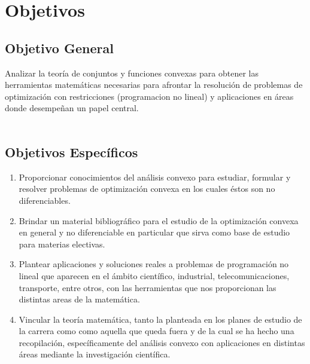 \section{Objetivos}

\subsection*{Objetivo General}
Analizar la teor\'ia de conjuntos y funciones convexas para obtener las herramientas matem\'aticas
necesarias para afrontar la resoluci\'on de problemas de optimizaci\'on con restricciones (programacion no lineal)
y aplicaciones en \'areas donde desempe\~nan un papel central.\\ \\

\subsection*{Objetivos Específicos}
\begin{enumerate}
	\item Proporcionar conocimientos del an\'alisis convexo para estudiar, formular y resolver problemas de optimizaci\'on convexa en los 
	      cuales \'estos son no diferenciables.
	\item Brindar un material bibliogr\'afico para el estudio de la optimizaci\'on convexa en general y no diferenciable en particular
	      que sirva como  base de estudio para materias electivas.
	\item Plantear aplicaciones y soluciones reales a problemas de programaci\'on no lineal que aparecen en el \'ambito cient\'ifico, 
	      industrial, telecomunicaciones, transporte, entre otros, con las herramientas que nos proporcionan las distintas areas de la 
	      matem\'atica.
	\item Vincular la teor\'ia matem\'atica, tanto la planteada en los planes de estudio de la carrera como como aquella que queda fuera
	      y de la cual se ha hecho una recopilaci\'on, espec\'ificamente del an\'alisis convexo con aplicaciones en distintas \'areas 
	      mediante la investigaci\'on cient\'ifica.
\end{enumerate}
